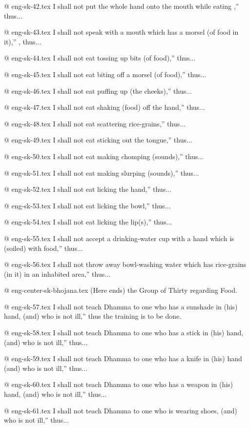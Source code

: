 @  eng-sk-42.tex
I shall not put the whole hand onto the mouth while eating ,” thus...

@  eng-sk-43.tex
I shall not speak with a mouth which has a morsel (of food in it),” , thus...

@  eng-sk-44.tex
I shall not eat tossing up bits (of food),” thus...

@  eng-sk-45.tex
I shall not eat biting off a morsel (of food),” thus...

@  eng-sk-46.tex
I shall not eat puffing up (the cheeks),” thus...

@  eng-sk-47.tex
I shall not eat shaking (food) off the hand,” thus...

@  eng-sk-48.tex
I shall not eat scattering rice-grains,” thus...

@  eng-sk-49.tex
I shall not eat sticking out the tongue,” thus...

@  eng-sk-50.tex
I shall not eat making chomping (sounds),” thus...

@  eng-sk-51.tex
I shall not eat making slurping (sounds),” thus...

@  eng-sk-52.tex
I shall not eat licking the hand,” thus...

@  eng-sk-53.tex
I shall not eat licking the bowl,” thus...

@  eng-sk-54.tex
I shall not eat licking the lip(s),” thus...

@  eng-sk-55.tex
I shall not accept a drinking-water cup with a hand which is (soiled) with food,” thus...

@  eng-sk-56.tex
I shall not throw away bowl-washing water which has rice-grains (in it) in an inhabited area,” thus...

@ eng-center-sk-bhojana.tex
(Here ends) the Group of Thirty regarding Food.

@ eng-sk-57.tex
I shall not teach Dhamma to one who has a sunshade in (his) hand, (and) who is not ill,” thus the training is to be done.

@  eng-sk-58.tex
I shall not teach Dhamma to one who has a stick in (his) hand, (and) who is not ill,” thus...

@  eng-sk-59.tex
I shall not teach Dhamma to one who has a knife in (his) hand (and) who is not ill,” thus...

@  eng-sk-60.tex
I shall not teach Dhamma to one who has a weapon in (his) hand, (and) who is not ill,” thus...

@  eng-sk-61.tex
I shall not teach Dhamma to one who is wearing shoes, (and) who is not ill,” thus...

